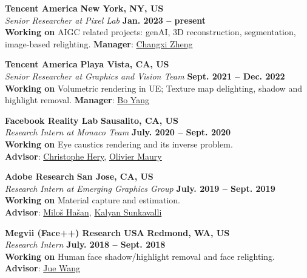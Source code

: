 \documentclass[margin,line]{resume}
\begin{document}
\begin{resume}
	\textbf{Tencent America} \hfill \textbf{New York, NY, US} \\
	\textsl{Senior Researcher at Pixel Lab} \hfill \textbf{Jan. 2023 -- present}\\
	\textbf{Working on} AIGC related projects: genAI, 3D reconstruction, segmentation, image-based relighting.
	\textbf{Manager}: \href{https://www.cs.columbia.edu/~cxz/}{Changxi Zheng}
	
	\vspace{0.0mm}

	\textbf{Tencent America} \hfill \textbf{Playa Vista, CA, US} \\
	\textsl{Senior Researcher at Graphics and Vision Team} \hfill \textbf{Sept. 2021 -- Dec. 2022}\\
	\textbf{Working on} Volumetric rendering in UE; Texture map delighting, shadow and highlight removal.
	\textbf{Manager}: \href{https://sites.google.com/site/boyanghome/home}{Bo Yang}
	
	\vspace{0.0mm}

	\textbf{Facebook Reality Lab} \hfill \textbf{Sausalito, CA, US} \\
	\textsl{Research Intern at Monaco Team} \hfill \textbf{July. 2020 -- Sept. 2020}\\
	\textbf{Working on} Eye caustics rendering and its inverse problem.\\
	\textbf{Advisor}: \href{https://graphics.pixar.com/library/indexAuthorChristophe_Hery.html}{Christophe Hery}, \href{https://www.imdb.com/name/nm1436524/}{Olivier Maury}       

    \vspace{0.0mm}

	\textbf{Adobe Research} \hfill \textbf{San Jose, CA, US} \\
	\textsl{Research Intern at Emerging Graphics Group} \hfill \textbf{July. 2019 -- Sept. 2019}\\
	\textbf{Working on} Material capture and estimation.\\
	\textbf{Advisor}: \href{http://miloshasan.net/}{Milo\v{s} Ha\v{s}an}, \href{https://research.adobe.com/person/kalyan-sunkavalli/}{Kalyan Sunkavalli}       

    \vspace{0.0mm}

	\textbf{Megvii (Face++) Research USA} \hfill \textbf{Redmond, WA, US} \\
	\textsl{Research Intern} \hfill \textbf{July. 2018 -- Sept. 2018}\\
	\textbf{Working on} Human face shadow/highlight removal and face relighting.\\
	\textbf{Advisor}: \href{https://www.juew.org/}{Jue Wang}        


\end{resume}
\end{document}
